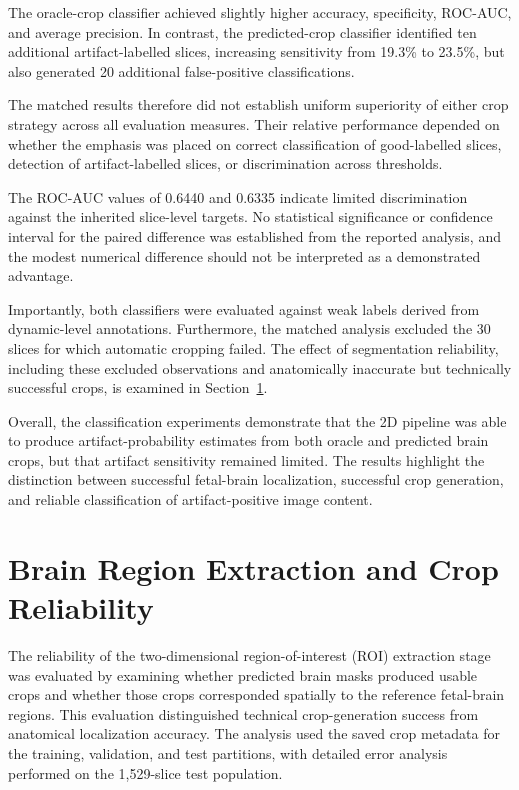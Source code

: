 
The oracle-crop classifier achieved slightly higher accuracy, specificity, ROC-AUC, and average precision. In contrast, the predicted-crop classifier identified ten additional artifact-labelled slices, increasing sensitivity from 19.3\% to 23.5\%, but also generated 20 additional false-positive classifications.

The matched results therefore did not establish uniform superiority of either crop strategy across all evaluation measures. Their relative performance depended on whether the emphasis was placed on correct classification of good-labelled slices, detection of artifact-labelled slices, or discrimination across thresholds.

The ROC-AUC values of 0.6440 and 0.6335 indicate limited discrimination against the inherited slice-level targets. No statistical significance or confidence interval for the paired difference was established from the reported analysis, and the modest numerical difference should not be interpreted as a demonstrated advantage.

Importantly, both classifiers were evaluated against weak labels derived from dynamic-level annotations. Furthermore, the matched analysis excluded the 30 slices for which automatic cropping failed. The effect of segmentation reliability, including these excluded observations and anatomically inaccurate but technically successful crops, is examined in Section~\ref{sec:results_roi_reliability}.

Overall, the classification experiments demonstrate that the 2D pipeline was able to produce artifact-probability estimates from both oracle and predicted brain crops, but that artifact sensitivity remained limited. The results highlight the distinction between successful fetal-brain localization, successful crop generation, and reliable classification of artifact-positive image content.

\section{Brain Region Extraction and Crop Reliability}
\label{sec:results_roi_reliability}

The reliability of the two-dimensional region-of-interest (ROI) extraction stage was evaluated by examining whether predicted brain masks produced usable crops and whether those crops corresponded spatially to the reference fetal-brain regions. This evaluation distinguished technical crop-generation success from anatomical localization accuracy. The analysis used the saved crop metadata for the training, validation, and test partitions, with detailed error analysis performed on the 1,529-slice test population.


